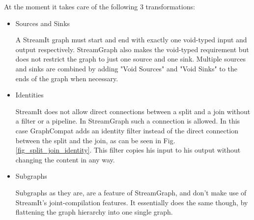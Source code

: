 \documentclass[journal]{IEEEtran}
\begin{document}
At the moment it takes care of the following 3 transformations:

\begin{itemize}
\item Sources and Sinks

  A StreamIt graph must start and end with exactly one void-typed input and
  output respectively. StreamGraph also makes the void-typed requirement but
  does not restrict the graph to just one source and one sink. Multiple sources
  and sinks are combined by adding "Void Sources" and "Void Sinks" to the ends
  of the graph when necessary.\\

\item Identities

  StreamIt does not allow direct connections between a split and a join without
  a filter or a pipeline. In StreamGraph such a connection is allowed. In this
  case GraphCompat adds an identity filter instead of the direct connection
  between the split and the join, as can be seen in Fig.
  \ref{fig_split_join_identity}. This filter copies his input to his output
  without changing the content in any way.\\

\item Subgraphs

  Subgraphs as they are, are a feature of StreamGraph, and don't make use of
  StreamIt's joint-compilation features. It essentially does the same though, by
  flattening the graph hierarchy into one single graph.\\

\end{itemize}
\end{document}
